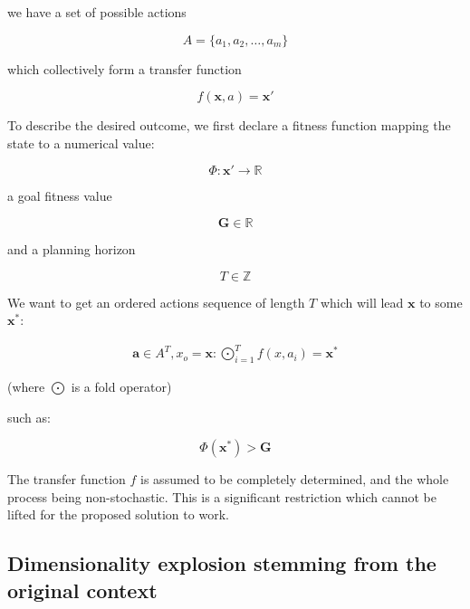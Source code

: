 \documentclass[11pt, a4paper]{article}
\begin{document}
	we have a set of possible actions
	
	\begin{equation}
		A = \{a_1, a_2,\ldots, a_m\}
	\end{equation}
	
	which collectively form a transfer function
	
	\begin{equation}\label{definitions:transfer-function}
		f(\mathbf{x}, a) = \mathbf{x}'
	\end{equation}

	To describe the desired outcome, we first declare a fitness function mapping the state to a numerical value:
	
	\begin{equation}
		\Phi : \mathbf{x}' \rightarrow \mathbb{R}
	\end{equation} 
	
	a goal fitness value 
	
	\begin{equation}
		\mathbf{G} \in \mathbb{R}
	\end{equation}
	
	and a planning horizon
	
	\begin{equation}
		T \in \mathbb{Z}
	\end{equation}
	
	We want to get an ordered actions sequence of length $T$ which will lead $\mathbf{x}$ to some $\mathbf{x}^*$:
	
	\begin{eqnarray}\label{definitions:fold}
		\mathbf{a} \in A^T, x_o = \mathbf{x}: \bigodot_{i=1}^{T} f(x, a_i) = \mathbf{x}^*
	\end{eqnarray}
	
	(where $\bigodot$ is a fold operator)
	
	such as:
	
	\begin{equation}
		\Phi(\mathbf{x}^*) > \mathbf{G}
	\end{equation}
	
	The transfer function $f$ is assumed to be completely determined, and the whole process being non-stochastic. This is a significant restriction which cannot be lifted for the proposed solution to work.

	\subsection{Dimensionality explosion stemming from the original context}
\end{document}
